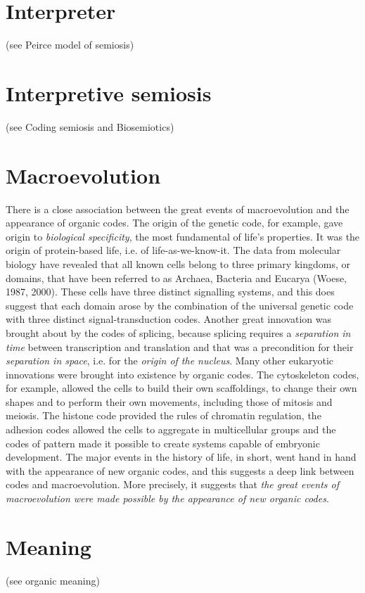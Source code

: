 \documentclass[12pt]{article}
\begin{document}
\section{Interpreter} (see Peirce model of semiosis)


\section{Interpretive semiosis} (see Coding semiosis and Biosemiotics)


\section{Macroevolution} 
There is a close association between the great events of macroevolution and the appearance of organic codes. The origin of the genetic code, for example, gave origin to \textit{biological specificity}, the most fundamental of life's properties. It was the origin of protein-based life, i.e. of life-as-we-know-it. The data from molecular biology have revealed that all known cells belong to three primary kingdoms, or domains, that have been referred to as Archaea, Bacteria and Eucarya (Woese, 1987, 2000). These cells have three distinct signalling systems, and this does suggest that each domain arose by the combination of the universal genetic code with three distinct signal-transduction codes. Another great innovation was brought about by the codes of splicing, because splicing requires a \textit{separation in time} between transcription and translation and that was a precondition for their \textit{separation in space}, i.e. for the \textit{origin of the nucleus}. Many other eukaryotic innovations were brought into existence by organic codes. The cytoskeleton codes, for example, allowed the cells to build their own scaffoldings, to change their own shapes and to perform their own movements, including those of mitosis and meiosis. The histone code provided the rules of chromatin regulation, the adhesion codes allowed the cells to aggregate in multicellular groups and the codes of pattern made it possible to create systems capable of embryonic development. The major events in the history of life, in short, went hand in hand with the appearance of new organic codes, and this suggests a deep link between codes and macroevolution. More precisely, it suggests that \textit{the great events of macroevolution were made possible by the appearance of new organic codes}. 


\section{Meaning} (see organic meaning)
\end{document}

